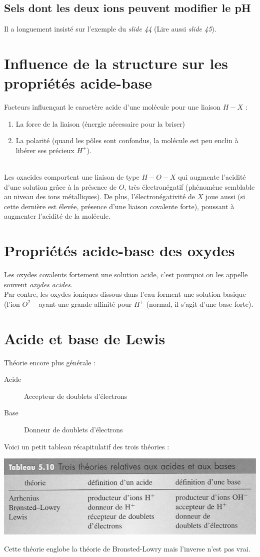 \documentclass	[11pt, a4paper, openany]{book}
\begin{document}
\subsection{Sels dont les deux ions peuvent modifier le pH}
Il a longuement insisté sur l'exemple du \textit{slide 44} (Lire aussi \textit{slide 45}).

\section{Influence de la structure sur les propriétés acide-base}
Facteurs influençant le caractère acide d'une molécule pour une liaison $H-X$ : 
\begin{enumerate}
	\item La force de la liaison (énergie nécessaire pour la briser)
	\item La polarité (quand les pôles sont confondus, la molécule est peu enclin à libérer ses précieux $H^+$).
\end{enumerate}
\ \\
Les oxacides comportent une liaison de type $H-O-X$ qui augmente l'acidité d'une solution grâce à la présence de $O$, très électronégatif (phénomène semblable au niveau des ions métalliques). De plus, l'électronégativité de $X$ joue aussi (si cette dernière est élevée, présence d'une liaison covalente forte), poussant à augmenter l'acidité de la molécule.

\section{Propriétés acide-base des oxydes}
Les oxydes covalents fortement une solution acide, c'est pourquoi on les appelle souvent \textit{oxydes acides}.\\
Par contre, les oxydes ioniques dissous dans l'eau forment une solution basique (l'ion $O^{2-}$ ayant une grande affinité pour $H^+$ (normal, il s'agit d'une base forte). 

\section{Acide et base de Lewis}
Théorie encore plus générale :
\begin{description}
	\item[Acide] Accepteur de doublets d'électrons
	\item[Base] Donneur de doublets d'électrons
\end{description}
Voici un petit tableau récapitulatif des trois théories : 
\begin{center}
	\includegraphics[scale=0.55]{image13.png}\\
\end{center}
Cette théorie englobe la théorie de Bronsted-Lowry mais l'inverse n'est pas vrai.
\end{document}
